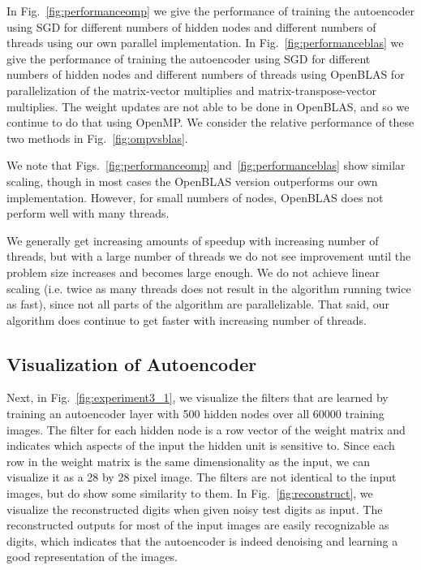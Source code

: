 In  Fig.~\ref{fig:performanceomp} we give the performance of training the autoencoder using SGD for different numbers of hidden nodes and different numbers of threads using our own parallel implementation.
In  Fig.~\ref{fig:performanceblas} we give the performance of training the autoencoder using SGD for different numbers of hidden nodes and different numbers of threads using OpenBLAS for parallelization of the matrix-vector multiplies and
matrix-transpose-vector multiplies. The weight updates are not able to be done in OpenBLAS, and so we continue to do that using OpenMP.
We consider the relative performance of these two methods in Fig.~\ref{fig:ompvsblas}.

We note that Figs.~\ref{fig:performanceomp} and~\ref{fig:performanceblas} show similar scaling, though in most cases the OpenBLAS version outperforms our own implementation. However, for small numbers of nodes, OpenBLAS does not perform well with many threads.

We generally get increasing amounts of speedup with increasing number of threads, but with a large number of threads we do not see improvement until the problem size increases and becomes large enough. We do not achieve linear scaling (i.e. twice as many threads does not result in the algorithm running twice as fast), since not all parts of the algorithm are parallelizable. That said, our algorithm does continue to get faster with increasing number of threads.





\subsection{Visualization of Autoencoder}

Next, in Fig.~\ref{fig:experiment3_1}, we visualize the filters that are
learned by training an autoencoder layer with 500 hidden nodes over all 60000
training images. The  filter for each hidden node is a row vector of the weight
matrix and indicates which aspects of the input the hidden unit is sensitive
to. Since each row in the weight matrix is the same dimensionality as the
input, we can visualize it as a 28 by 28 pixel image. The filters are not
identical to the input images, but do show some similarity to them. In
Fig.~\ref{fig:reconstruct}, we visualize the reconstructed digits when given
noisy test digits as input. The reconstructed outputs for most of the input
images are easily recognizable as digits, which indicates that the autoencoder
is indeed denoising and learning a good representation of the images.

